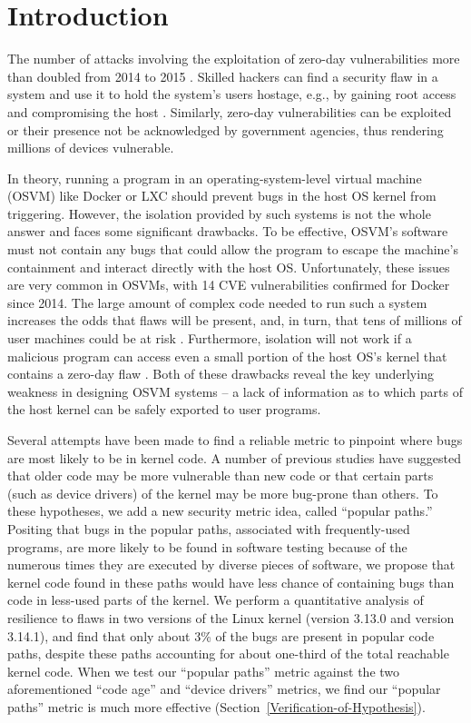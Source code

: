 \section{Introduction}
\label{sec.introduction}

The number of attacks involving the exploitation of zero-day vulnerabilities
more than doubled from 2014 to 2015 \cite{zero-day}. Skilled hackers can find a
 security flaw in a system and use it to hold the system's users hostage, e.g.,
by gaining root access and compromising the host \cite{linux-0day}. Similarly,
zero-day vulnerabilities can be exploited \cite{fbi-0day} or their presence not
be acknowledged \cite{nsa-0day} by government agencies, thus rendering millions
of devices vulnerable.

In theory, running a program in an operating-system-level virtual machine (OSVM)
like Docker \cite{Docker} or LXC \cite{LXC} should
prevent bugs in the host OS kernel from triggering.
However, the isolation provided by such systems is not the whole answer and
faces some significant drawbacks.
To be effective, OSVM's software must not contain any bugs that could allow
the program to escape the machine's containment and interact directly with the host OS.
Unfortunately, these issues are very common in OSVMs, with 14 CVE vulnerabilities
confirmed for Docker \cite{Docker-Vulnerabilities} since 2014.
The large amount of complex code needed to run such a system increases the odds
that flaws will be present, and, in turn,
that tens of millions of user machines could be at risk \cite{linux-0day}.
Furthermore, isolation will not work if a malicious program can access even a small portion of the host OS's kernel
that contains a zero-day flaw \cite{CVE-2016-5195}.
Both of these drawbacks reveal the key underlying weakness in designing OSVM systems -- a lack of information
as to which parts of the host kernel can be safely exported to user programs.

Several attempts have been made to find a reliable metric to pinpoint where bugs
 are most likely to be in kernel code.
A number of previous studies have suggested that older code may be more vulnerable
 than new code \cite{ozment2006milk}
or that certain parts (such as device drivers) of the kernel \cite{PittSFIeld}
may be more bug-prone than others.
To these hypotheses, we add a new security metric idea, called ``popular paths.''
Positing that bugs in the popular paths, associated with frequently-used programs,
are more likely to be found in software testing
because of the numerous times they are executed by diverse pieces of software,
we propose that kernel code found in these paths 
would have less chance of containing bugs than code in less-used parts of the kernel.
We perform a quantitative analysis of resilience to flaws in two versions
of the Linux kernel (version 3.13.0 and version 3.14.1),
and find that only about 3\% of the bugs are present in popular code paths,
despite these paths accounting for about one-third of the total reachable kernel code.
When we test our ``popular paths'' metric against the two aforementioned
 ``code age'' and ``device drivers'' metrics,
we find our ``popular paths'' metric is much more effective
 (Section~{\ref{Verification-of-Hypothesis}}).

